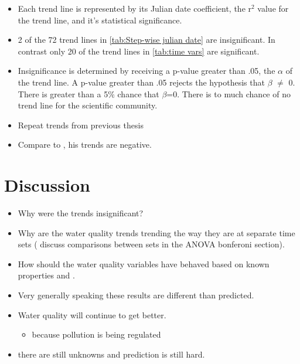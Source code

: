 \begin{itemize}
	\item Each trend line is represented by its Julian date coefficient, the r$^2$ value for the trend line, and it's statistical significance.
	\item 2 of the 72 trend lines in \autoref{tab:Step-wise julian date} are insignificant.  In contrast only 20 of the trend lines in \autoref{tab:time vars} are significant.
	\item Insignificance is determined  by receiving a p-value greater than .05, the $\alpha$ of the trend line.  A p-value greater than .05 rejects the hypothesis that $\beta$ $\neq$ 0.  There is greater than a 5$\%$ chance that $\beta$=0.  There is to much chance of no trend line for the scientific community.
	\item Repeat trends from previous thesis
	\item Compare to \citep{robinson2008ph}, his trends are negative.
\end{itemize}
\section{Discussion}
\begin{itemize}
	\item Why were the trends insignificant?
	\item Why are the water quality trends trending the way they are at separate time sets ( discuss comparisons between sets in the ANOVA bonferoni section).
	\item How should the water quality variables have behaved based on known properties and \citep{robinson2008ph}.
	\item Very generally speaking these results are different than \citep{robinson2008ph} predicted.
	\item Water quality will continue to get better.
	\begin{itemize}
		\item because pollution is being regulated
	\end{itemize}
	\item there are still unknowns and prediction is still hard.
\end{itemize}
	

